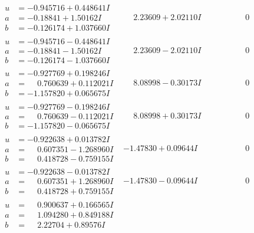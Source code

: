 \documentclass[1p]{elsarticle_modified}
\theoremstyle{definition}
\begin{document}
$$\begin{array}{c|c|c}
\begin{aligned}
u &= -0.945716 + 0.448641 I \\
a &= -0.18841 + 1.50162 I \\
b &= -0.126174 + 1.037660 I\end{aligned}
 & \phantom{-}2.23609 + 2.02110 I & \phantom{-0.000000 } 0 \\ \hline\begin{aligned}
u &= -0.945716 - 0.448641 I \\
a &= -0.18841 - 1.50162 I \\
b &= -0.126174 - 1.037660 I\end{aligned}
 & \phantom{-}2.23609 - 2.02110 I & \phantom{-0.000000 } 0 \\ \hline\begin{aligned}
u &= -0.927769 + 0.198246 I \\
a &= \phantom{-}0.760639 + 0.112021 I \\
b &= -1.157820 + 0.065675 I\end{aligned}
 & \phantom{-}8.08998 - 0.30173 I & \phantom{-0.000000 } 0 \\ \hline\begin{aligned}
u &= -0.927769 - 0.198246 I \\
a &= \phantom{-}0.760639 - 0.112021 I \\
b &= -1.157820 - 0.065675 I\end{aligned}
 & \phantom{-}8.08998 + 0.30173 I & \phantom{-0.000000 } 0 \\ \hline\begin{aligned}
u &= -0.922638 + 0.013782 I \\
a &= \phantom{-}0.607351 - 1.268960 I \\
b &= \phantom{-}0.418728 - 0.759155 I\end{aligned}
 & -1.47830 + 0.09644 I & \phantom{-0.000000 } 0 \\ \hline\begin{aligned}
u &= -0.922638 - 0.013782 I \\
a &= \phantom{-}0.607351 + 1.268960 I \\
b &= \phantom{-}0.418728 + 0.759155 I\end{aligned}
 & -1.47830 - 0.09644 I & \phantom{-0.000000 } 0 \\ \hline\begin{aligned}
u &= \phantom{-}0.900637 + 0.166565 I \\
a &= \phantom{-}1.094280 + 0.849188 I \\
b &= \phantom{-}2.22704 + 0.89576 I\end{aligned}

\end{array}$$
\end{document}
